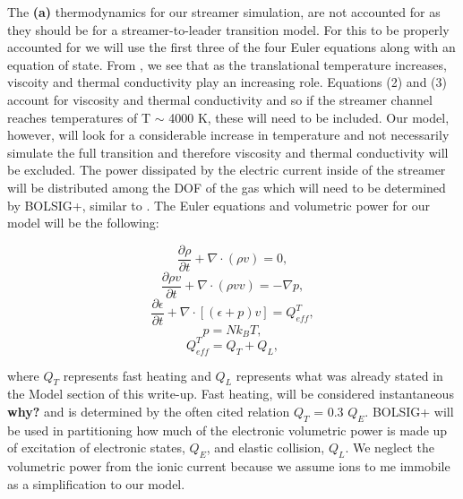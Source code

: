 \documentclass[]{article}
\begin{document}
	 The \textbf{(a)} thermodynamics for our streamer simulation, are not accounted for as they should be for a streamer-to-leader transition model. For this to be properly accounted for we will use the first three of the four Euler equations along with an equation of state. From \citet[Figure 2a]{daSilva:2013a}, we see that as the translational temperature increases, viscoity and thermal conductivity play an increasing role. Equations (2) and (3) account for viscosity and thermal conductivity and so if the streamer channel reaches temperatures of T $\sim$ 4000 K, these will need to be included. Our model, however, will look for a considerable increase in temperature and not necessarily simulate the full transition and therefore viscosity and thermal conductivity will be excluded. The power dissipated by the electric current inside of the streamer will be distributed among the DOF of the gas which will need to be determined by BOLSIG+, similar to \citet[Figure 3]{daSilva:2013a}. The Euler equations and volumetric power for our model will be the following:
	 	
	 \begin{equation}
	 \frac{\partial\rho}{\partial t} + \nabla \cdot (\rho v) = 0,
	 \end{equation} 
	 \begin{equation}
	 \frac{\partial \rho v}{\partial t} + \nabla \cdot (\rho v v) = -\nabla p,  
	 \end{equation}
	 \begin{equation}
	 \frac{\partial \epsilon}{\partial t} + \nabla \cdot [(\epsilon + p)v] = Q_{eff}^T,  
	 \end{equation}	 
	 \begin{equation}
	 p = N k_B T,
	 \end{equation}
	 \begin{equation}
	 Q_{eff}^T = Q_T + Q_L, 
	 \end{equation}
	
	 where $Q_T$ represents fast heating and $Q_L$ represents what was already stated in the Model section of this write-up. Fast heating, will be considered instantaneous \textbf{why?} and is determined by the often cited relation $Q_T$ = 0.3 $Q_E$. BOLSIG+ \citep{Hagelaar:2005} will be used in partitioning how much of the electronic volumetric power is made up of excitation of electronic states, $Q_E$, and elastic collision, $Q_L$. We neglect the volumetric power from the ionic current because we assume ions to me immobile as a simplification to our model. 
	
\end{document}

